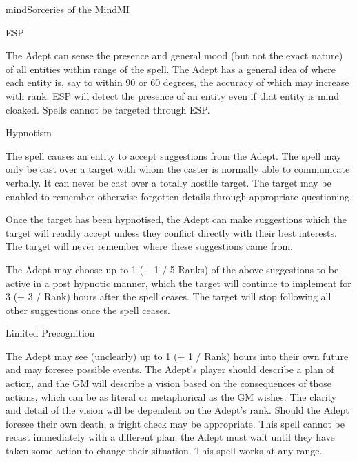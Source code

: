 \begin{College}[1.6]{mind}{Sorceries of the Mind}{MI}
\begin{spell}[G-4]{ESP}

\begin{effects}
The Adept can sense the presence and general mood (but not the exact
nature) of all entities within range of the spell.  The Adept has a
general idea of where each entity is, say to within 90 or 60 degrees,
the accuracy of which may increase with rank.  ESP will detect the
presence of an entity even if that entity is mind cloaked. Spells
cannot be targeted through ESP.
\end{effects}
\end{spell}

\begin{spell}[G-5]{Hypnotism}

\begin{effects}
The spell causes an entity to accept suggestions from the Adept.  The
spell may only be cast over a target with whom the caster is normally
able to communicate verbally.  It can never be cast over a totally
hostile target.  The target may be enabled to remember otherwise
forgotten details through appropriate questioning.

Once the target has been hypnotised, the Adept can make suggestions
which the target will readily accept unless they conflict directly
with their best interests.  The target will never remember where these
suggestions came from.

The Adept may choose up to 1 (+ 1 / 5 Ranks) of the above suggestions
to be active in a post hypnotic manner, which the target will continue
to implement for 3 (+ 3 / Rank) hours after the spell ceases.  The
target will stop following all other suggestions once the spell
ceases.
\end{effects}
\end{spell}

\begin{spell}[G-6]{Limited Precognition}

\begin{effects}
The Adept may see (unclearly) up to 1 (+ 1 / Rank) hours into their
own future and may foresee possible events.  The Adept’s player should
describe a plan of action, and the GM will describe a vision based on
the consequences of those actions, which can be as literal or
metaphorical as the GM wishes. The clarity and detail of the vision
will be dependent on the Adept’s rank.  Should the Adept foresee their
own death, a fright check may be appropriate. This spell cannot be
recast immediately with a different plan; the Adept must wait until
they have taken some action to change their situation. This spell
works at any range.
\end{effects}
\end{spell}


\end{College}
